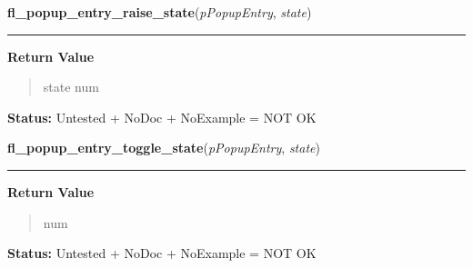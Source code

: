     \label{xformslib:library:fl_popup_entry_raise_state}

    \vspace{0.5ex}

\hspace{.8\funcindent}\begin{boxedminipage}{\funcwidth}

    \raggedright \textbf{fl\_popup\_entry\_raise\_state}(\textit{pPopupEntry}, \textit{state})

    \vspace{-1.5ex}

    \rule{\textwidth}{0.5\fboxrule}
\setlength{\parskip}{2ex}
\setlength{\parskip}{1ex}
      \textbf{Return Value}
    \vspace{-1ex}

      \begin{quote}
      state num

      \end{quote}

\textbf{Status:} Untested + NoDoc + NoExample = NOT OK



    \end{boxedminipage}

    \label{xformslib:library:fl_popup_entry_toggle_state}

    \vspace{0.5ex}

\hspace{.8\funcindent}\begin{boxedminipage}{\funcwidth}

    \raggedright \textbf{fl\_popup\_entry\_toggle\_state}(\textit{pPopupEntry}, \textit{state})

    \vspace{-1.5ex}

    \rule{\textwidth}{0.5\fboxrule}
\setlength{\parskip}{2ex}
\setlength{\parskip}{1ex}
      \textbf{Return Value}
    \vspace{-1ex}

      \begin{quote}
      num

      \end{quote}

\textbf{Status:} Untested + NoDoc + NoExample = NOT OK



    \end{boxedminipage}

